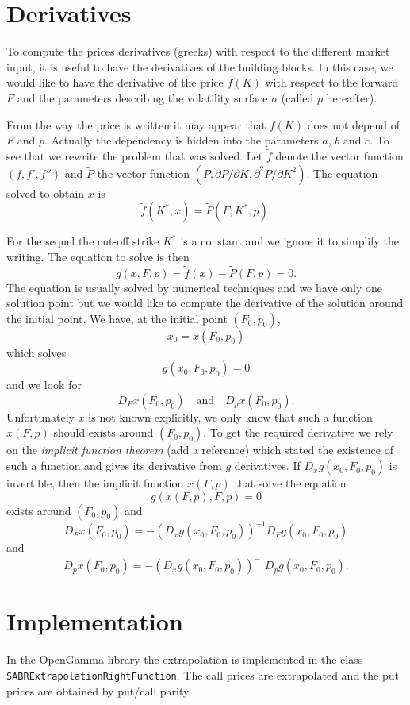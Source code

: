 \documentclass[]{amsart}
\newcommand{\class}[1]{{\texttt{#1}}}
\begin{document}
\section{Derivatives}

To compute the prices derivatives (greeks) with respect to the different market input, it is useful to have the derivatives of the building blocks. In this case, we would like to have the derivative of the price $f(K)$ with respect to the forward $F$ and the parameters describing the volatility surface $\sigma$ (called $p$ hereafter). 

From the way the price is written it may appear that $f(K)$ does not depend of $F$ and $p$. Actually the dependency is hidden into the parameters $a$, $b$ and $c$. To see that we rewrite the problem that was solved. Let $\tilde f$ denote the vector function $(f, f', f'')$ and $\tilde P$ the vector function $(P, \partial P / \partial K, \partial^2 P/\partial K^2)$. The equation solved to obtain $x$ is
\[
\tilde f(K^*, x) = \tilde P (F, K^*, p).
\]

For the sequel the cut-off strike $K^*$ is a constant and we ignore it to simplify the writing. The equation to solve is then
\[
g(x, F, p) = \tilde f(x) - \tilde P(F, p)=0.
\]
The equation is usually solved by numerical techniques and we have only one solution point but we would like to compute the derivative of the solution around the initial point. We have, at the initial point $(F_0, p_0)$,
\[
x_0 = x(F_0, p_0)
\]
which solves
\[
g(x_0, F_0, p_0) = 0
\]
and we look for 
\[
D_F x(F_0, p_0) \quad \mbox{and} \quad D_p x(F_0, p_0).
\]
Unfortunately $x$ is not known explicitly, we only know that such a function $x(F,p)$ should exists around $(F_0, p_0)$. To get the required derivative we rely on the \emph{implicit function theorem} (add a reference) which stated the existence of such a function and gives its derivative from $g$ derivatives. If $D_x g(x_0, F_0, p_0)$ is invertible, then the implicit function $x(F,p)$ that solve the equation
\[
g(x(F,p), F, p)=0
\]
exists around $(F_0,p_0)$ and
\[
D_F x(F_0, p_0) = - (D_x g(x_0, F_0, p_0))^{-1}D_F g(x_0, F_0, p_0)
\]
and 
\[
D_p x(F_0, p_0) = - (D_x g(x_0, F_0, p_0))^{-1}D_p g(x_0, F_0, p_0).
\]


\section{Implementation}

In the OpenGamma library the extrapolation is implemented in the class \class{SABRExtrapolationRightFunction}. The call prices are extrapolated and the put prices are obtained by put/call parity.
\end{document}
